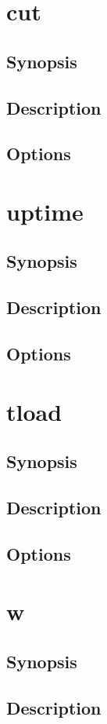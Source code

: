 \documentclass[a4paper, 10pt, onecolumn, openright, oneside]{book}
\begin{document}
		\section{cut}
			\subsection{Synopsis}
			\subsection{Description}
			\subsection{Options}
		\section{uptime}
			\subsection{Synopsis}
			\subsection{Description}
			\subsection{Options}
		\section{tload}
			\subsection{Synopsis}
			\subsection{Description}
			\subsection{Options}
		\section{w}
			\subsection{Synopsis}
			\subsection{Description}
\end{document}
